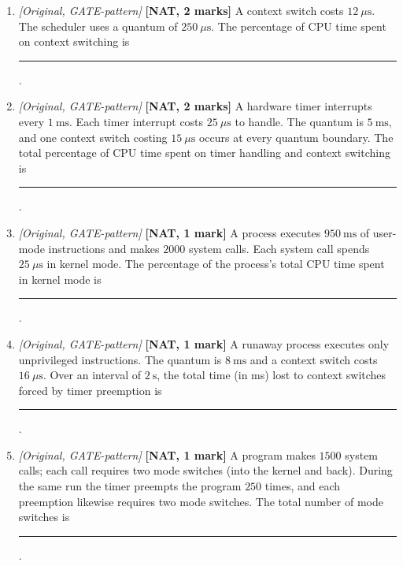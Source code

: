 \documentclass[11pt]{article}
\begin{document}
\begin{enumerate}
\item[\textbf{Q6}] \textit{[Original, GATE-pattern]} \textbf{[NAT, 2 marks]} A context switch costs $12\ \mu\text{s}$. The scheduler uses a quantum of $250\ \mu\text{s}$. The percentage of CPU time spent on context switching is \rule{1.5cm}{0.4pt}.

\item[\textbf{Q7}] \textit{[Original, GATE-pattern]} \textbf{[NAT, 2 marks]} A hardware timer interrupts every $1\ \text{ms}$. Each timer interrupt costs $25\ \mu\text{s}$ to handle. The quantum is $5\ \text{ms}$, and one context switch costing $15\ \mu\text{s}$ occurs at every quantum boundary. The total percentage of CPU time spent on timer handling and context switching is \rule{1.5cm}{0.4pt}.

\item[\textbf{Q8}] \textit{[Original, GATE-pattern]} \textbf{[NAT, 1 mark]} A process executes $950\ \text{ms}$ of user-mode instructions and makes $2000$ system calls. Each system call spends $25\ \mu\text{s}$ in kernel mode. The percentage of the process's total CPU time spent in kernel mode is \rule{1.5cm}{0.4pt}.

\item[\textbf{Q9}] \textit{[Original, GATE-pattern]} \textbf{[NAT, 1 mark]} A runaway process executes only unprivileged instructions. The quantum is $8\ \text{ms}$ and a context switch costs $16\ \mu\text{s}$. Over an interval of $2\ \text{s}$, the total time (in ms) lost to context switches forced by timer preemption is \rule{1.5cm}{0.4pt}.

\item[\textbf{Q10}] \textit{[Original, GATE-pattern]} \textbf{[NAT, 1 mark]} A program makes $1500$ system calls; each call requires two mode switches (into the kernel and back). During the same run the timer preempts the program $250$ times, and each preemption likewise requires two mode switches. The total number of mode switches is \rule{1.5cm}{0.4pt}.

\end{enumerate}
\end{document}
